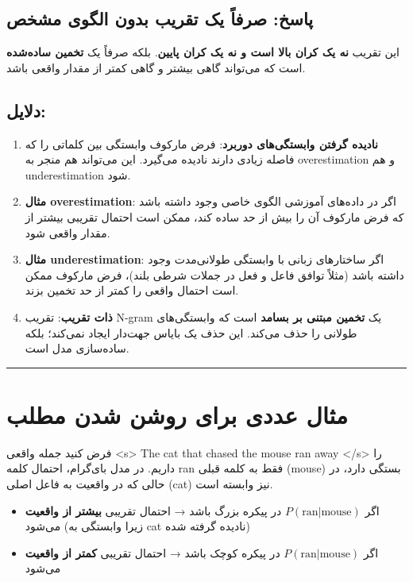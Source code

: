 \documentclass[11pt,a4paper]{article}
\newcommand{\en}[1]{\textenglish{#1}}
\newcommand{\separator}{\vspace{1em}\noindent\rule{\linewidth}{0.4pt}\vspace{1em}}
\begin{document}
\subsection*{پاسخ: صرفاً یک تقریب بدون الگوی مشخص}
این تقریب \textbf{نه یک کران بالا است و نه یک کران پایین}. بلکه صرفاً یک \textbf{تخمین ساده‌شده} است که می‌تواند گاهی بیشتر و گاهی کمتر از مقدار واقعی باشد.

\subsection*{دلایل:}

\begin{enumerate}
\item \textbf{نادیده گرفتن وابستگی‌های دوربرد}: فرض مارکوف وابستگی بین کلماتی را که فاصله زیادی دارند نادیده می‌گیرد. این می‌تواند هم منجر به overestimation و هم underestimation شود.

\item \textbf{مثال overestimation}: اگر در داده‌های آموزشی الگوی خاصی وجود داشته باشد که فرض مارکوف آن را بیش از حد ساده کند، ممکن است احتمال تقریبی بیشتر از مقدار واقعی شود.

\item \textbf{مثال underestimation}: اگر ساختارهای زبانی با وابستگی طولانی‌مدت وجود داشته باشد (مثلاً توافق فاعل و فعل در جملات شرطی بلند)، فرض مارکوف ممکن است احتمال واقعی را کمتر از حد تخمین بزند.

\item \textbf{ذات تقریب}: تقریب N-gram یک \textbf{تخمین مبتنی بر بسامد} است که وابستگی‌های طولانی را حذف می‌کند. این حذف یک بایاس جهت‌دار ایجاد نمی‌کند؛ بلکه ساده‌سازی مدل است.
\end{enumerate}

\separator
\section{مثال عددی برای روشن شدن مطلب}
فرض کنید جمله واقعی \en{<s> The cat that chased the mouse ran away </s>} را داریم. در مدل بای‌گرام، احتمال کلمه \en{ran} فقط به کلمه قبلی (\en{mouse}) بستگی دارد، در حالی که در واقعیت به فاعل اصلی (\en{cat}) نیز وابسته است.

\begin{itemize}
\item اگر $P(\text{ran}|\text{mouse})$ در پیکره بزرگ باشد → احتمال تقریبی \textbf{بیشتر از واقعیت} می‌شود (زیرا وابستگی به \en{cat} نادیده گرفته شده)
\item اگر $P(\text{ran}|\text{mouse})$ در پیکره کوچک باشد → احتمال تقریبی \textbf{کمتر از واقعیت} می‌شود
\end{itemize}
\end{document}

